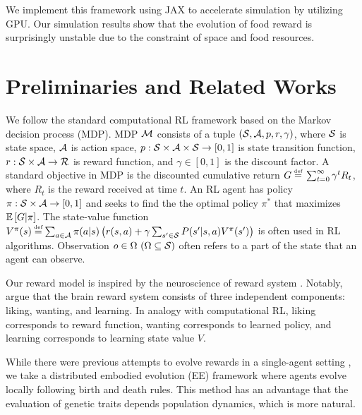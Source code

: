 We implement this framework using JAX\citep{jax2018github} to accelerate simulation by utilizing GPU. Our simulation results show that the evolution of food reward is surprisingly unstable due to the constraint of space and food resources.

\section{Preliminaries and Related Works}\label{sec:related}
We follow the standard computational RL framework \citep{suttonReinforcementLearningIntroduction2018} based on the Markov decision process (MDP). MDP $\mathcal{M}{}$ consists of a tuple $(\mathcal{S}{}, \mathcal{A}{}, p, r, \gamma)$, where $\mathcal{S}{}$ is state space, $\mathcal{A}{}$ is action space, $p: \mathcal{S}\times\mathcal{A}\times \mathcal{S} \rightarrow [0, 1]$ is state transition function, $r: \mathcal{S}\times\mathcal{A} \rightarrow \mathcal{R}$ is reward function, and $\gamma \in [0, 1]$ is the discount factor. A standard objective in MDP is the discounted cumulative return $G \defequal{} \sum_{t=0}^{\infty}\gamma^t R_{t}$, where $R_t$ is the reward received at time $t$. An RL agent has policy $\pi: \mathcal{S} \times \mathcal{A} \rightarrow [0, 1]$ and seeks to find the the optimal policy $\pi^{*}$ that maximizes $\mathbb{E} \left[G|\pi\right]$. The state-value function $V^\pi(s) \defequal \sum_{a \in \A} \pi(a|s) \left( r(s, a) + \gamma \sum_{s' \in \X} P(s'|s, a) V^\pi(s') \right)$ is often used in RL algorithms. Observation $o \in \Omega~(\Omega \subseteq \mathcal{S})$ often refers to a part of the state that an agent can observe.

Our reward model is inspired by the neuroscience of reward system \citep{schultzNeuronalRewardDecision2015, berridgePleasureSystemsBrain2015}. Notably, \citet{berridgeDissectingComponentsReward2009} argue that the brain reward system consists of three independent components: liking, wanting, and learning. In analogy with computational RL, liking corresponds to reward function, wanting corresponds to learned policy, and learning corresponds to learning state value $V$. %

While 
there were previous attempts to evolve rewards in a single-agent setting \citep{singhWhereRewardsCome2009,niekumEvolutionRewardFunctions2011,zhengWhatCanLearned2020},
we take a distributed embodied evolution (EE) framework \citep{watsonEmbodiedEvolutionDistributing2002,bredecheEmbodiedEvolutionCollective2018}
where agents evolve locally following birth and death rules. This method has an advantage that the evaluation of genetic traits depends population dynamics, which is more natural.

